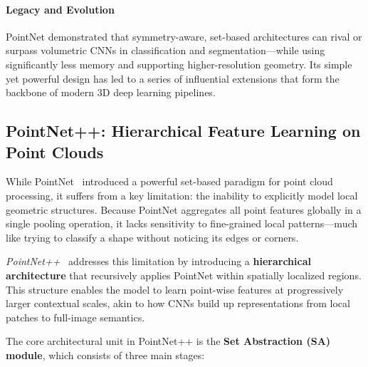 \paragraph{Legacy and Evolution}
PointNet demonstrated that symmetry-aware, set-based architectures can rival or surpass volumetric CNNs in classification and segmentation—while using significantly less memory and supporting higher-resolution geometry. Its simple yet powerful design has led to a series of influential extensions that form the backbone of modern 3D deep learning pipelines.

\subsection{PointNet++: Hierarchical Feature Learning on Point Clouds}
\label{subsec:chapter23_pointnetpp}

While PointNet~\cite{qi2017_pointnet} introduced a powerful set-based paradigm for point cloud processing, it suffers from a key limitation: the inability to explicitly model local geometric structures. Because PointNet aggregates all point features globally in a single pooling operation, it lacks sensitivity to fine-grained local patterns—much like trying to classify a shape without noticing its edges or corners.

\emph{PointNet++}~\cite{qi2017_pointnetplusplus} addresses this limitation by introducing a \textbf{hierarchical architecture} that recursively applies PointNet within spatially localized regions. This structure enables the model to learn point-wise features at progressively larger contextual scales, akin to how CNNs build up representations from local patches to full-image semantics.

\vspace{1em}
\noindent
The core architectural unit in PointNet++ is the \textbf{Set Abstraction (SA) module}, which consists of three main stages:

